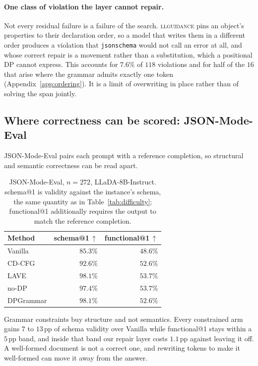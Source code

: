 \documentclass{article}
\begin{document}
\paragraph{One class of violation the layer cannot repair.}
Not every residual failure is a failure of the search. \textsc{llguidance} pins
an object's properties to their declaration order, so a model that writes them
in a different order produces a violation that \texttt{jsonschema} would not
call an error at all, and whose correct repair is a movement rather than a
substitution, which a positional DP cannot express. This accounts for $7.6\%$ of
$118$ violations and for half of the $16$ that arise where the grammar admits
exactly one token (Appendix~\ref{app:ordering}). It is a limit of overwriting in
place rather than of solving the span jointly.

\subsection{Where correctness can be scored: JSON-Mode-Eval}
\label{sec:jme}

JSON-Mode-Eval pairs each prompt with a reference completion, so structural and
semantic correctness can be read apart.

\begin{table}[h]
\centering
\small
\caption{JSON-Mode-Eval, $n{=}272$, LLaDA-8B-Instruct. schema@1 is validity against the instance's schema, the same quantity as in
Table~\ref{tab:difficulty}; functional@1 additionally requires the output to
match the reference completion.}
\label{tab:jme}
\begin{tabular}{lrr}
\toprule
Method & schema@1\,$\uparrow$ & functional@1\,$\uparrow$ \\
\midrule
Vanilla    & $85.3\%$ & $48.6\%$ \\
CD-CFG      & $92.6\%$ & $52.6\%$ \\
LAVE       & $\mathbf{98.1\%}$ & $\mathbf{53.7\%}$ \\
no-DP      & $97.4\%$ & $\mathbf{53.7\%}$ \\
DPGrammar  & $\mathbf{98.1\%}$ & $52.6\%$ \\
\bottomrule
\end{tabular}
\end{table}

Grammar constraints buy structure and not semantics. Every constrained arm gains
$7$ to $13$\,pp of schema validity over Vanilla while functional@1 stays
within a $5$\,pp band, and inside that band our repair layer costs
$1.1$\,pp against leaving it off. A well-formed document is not a correct one,
and rewriting tokens to make it well-formed can move it away from the answer.
\end{document}
